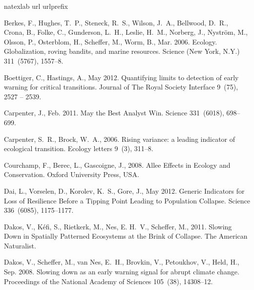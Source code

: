 \documentclass[authoryear,review,12pt]{elsarticle}
\begin{document}
\begin{thebibliography}{25}
\expandafter\ifx\csname natexlab\endcsname\relax\def\natexlab#1{#1}\fi
\expandafter\ifx\csname url\endcsname\relax
  \def\url#1{\texttt{#1}}\fi
\expandafter\ifx\csname urlprefix\endcsname\relax\def\urlprefix{URL }\fi

Berkes, F., Hughes, T.~P., Steneck, R.~S., Wilson, J.~A., Bellwood, D.~R.,
  Crona, B., Folke, C., Gunderson, L.~H., Leslie, H.~M., Norberg, J.,
  Nystr\"{o}m, M., Olsson, P., Osterblom, H., Scheffer, M., Worm, B., Mar.
  2006. {Ecology. Globalization, roving bandits, and marine resources.} Science
  (New York, N.Y.) 311~(5767), 1557--8.


Boettiger, C., Hastings, A., May 2012. {Quantifying limits to detection of
  early warning for critical transitions}. Journal of The Royal Society
  Interface 9~(75), 2527 -- 2539.


Carpenter, J., Feb. 2011. {May the Best Analyst Win}. Science 331~(6018),
  698--699.


Carpenter, S.~R., Brock, W.~A., 2006. {Rising variance: a leading indicator of
  ecological transition.} Ecology letters 9~(3), 311--8.


Courchamp, F., Berec, L., Gascoigne, J., 2008. {Allee Effects in Ecology and
  Conservation}. Oxford University Press, USA.


Dai, L., Vorselen, D., Korolev, K.~S., Gore, J., May 2012. {Generic Indicators
  for Loss of Resilience Before a Tipping Point Leading to Population
  Collapse}. Science 336~(6085), 1175--1177.


Dakos, V., K\'{e}fi, S., Rietkerk, M., Nes, E. H.~V., Scheffer, M., 2011.
  {Slowing Down in Spatially Patterned Ecosystems at the Brink of Collapse}.
  The American Naturalist.

Dakos, V., Scheffer, M., van Nes, E.~H., Brovkin, V., Petoukhov, V., Held, H.,
  Sep. 2008. {Slowing down as an early warning signal for abrupt climate
  change.} Proceedings of the National Academy of Sciences 105~(38), 14308--12.



\end{thebibliography}
\end{document}

